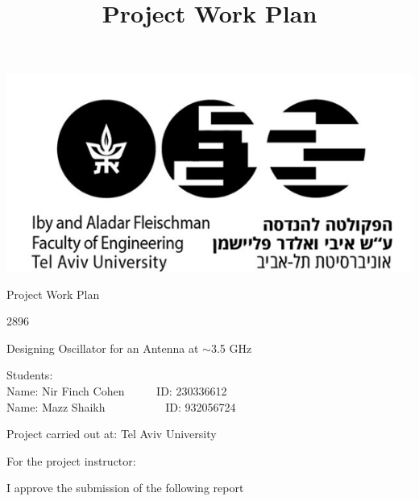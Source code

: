 \documentclass[]{extarticle}
\title{Project Work Plan}
\date{}
\begin{document}
\begin{center}
    \includegraphics[scale=0.8]{TAU.png}\\
    \vspace{1cm} %
    
    \Large Project Work Plan\\
    \vspace{1cm} %
    
    \large 2896\\
    \vspace{0.5cm} %
    
    \large Designing Oscillator for an Antenna at \(\sim\)3.5 GHz\\
    \vspace{1cm} %
    
\end{center}

\large {Students}:\\

Name: Nir Finch Cohen \ \ \ \ \ ID: 230336612\\

Name: Mazz Shaikh \ \ \ \ \ \ \ \ \ \  ID: 932056724\\

\vspace{1cm} %

\large Project carried out at: Tel Aviv University\\
\vspace{1cm} %

\large For the project instructor:\\
\vspace{0.3cm} %

I approve the submission of the following report
\end{document}
